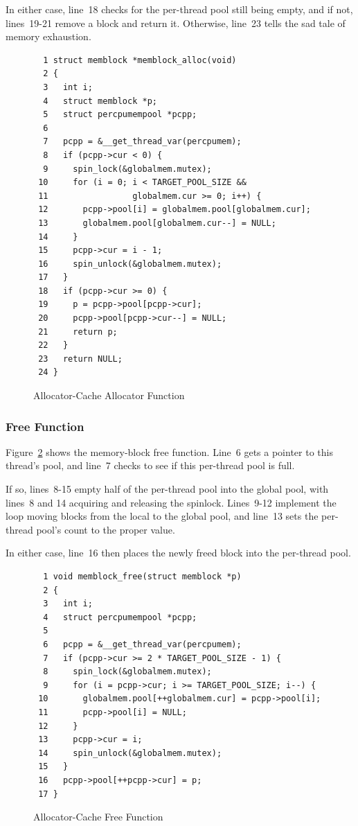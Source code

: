 In either case, line~18 checks for the per-thread pool still being
empty, and if not, lines~19-21 remove a block and return it.
Otherwise, line~23 tells the sad tale of memory exhaustion.

\begin{figure}[htbp]
{ \scriptsize
\begin{verbatim}
  1 struct memblock *memblock_alloc(void)
  2 {
  3   int i;
  4   struct memblock *p;
  5   struct percpumempool *pcpp;
  6
  7   pcpp = &__get_thread_var(percpumem);
  8   if (pcpp->cur < 0) {
  9     spin_lock(&globalmem.mutex);
 10     for (i = 0; i < TARGET_POOL_SIZE &&
 11                 globalmem.cur >= 0; i++) {
 12       pcpp->pool[i] = globalmem.pool[globalmem.cur];
 13       globalmem.pool[globalmem.cur--] = NULL;
 14     }
 15     pcpp->cur = i - 1;
 16     spin_unlock(&globalmem.mutex);
 17   }
 18   if (pcpp->cur >= 0) {
 19     p = pcpp->pool[pcpp->cur];
 20     pcpp->pool[pcpp->cur--] = NULL;
 21     return p;
 22   }
 23   return NULL;
 24 }
\end{verbatim}
}
\caption{Allocator-Cache Allocator Function}
\label{fig:SMPdesign:Allocator-Cache Allocator Function}
\end{figure}

\subsubsection{Free Function}

Figure~\ref{fig:SMPdesign:Allocator-Cache Free Function} shows
the memory-block free function.
Line~6 gets a pointer to this thread's pool, and
line~7 checks to see if this per-thread pool is full.

If so, lines~8-15 empty half of the per-thread pool into the global pool,
with lines~8 and 14 acquiring and releasing the spinlock.
Lines~9-12 implement the loop moving blocks from the local to the
global pool, and line~13 sets the per-thread pool's count to the proper
value.

In either case, line~16 then places the newly freed block into the
per-thread pool.

\begin{figure}[htbp]
{ \scriptsize
\begin{verbatim}
  1 void memblock_free(struct memblock *p)
  2 {
  3   int i;
  4   struct percpumempool *pcpp;
  5
  6   pcpp = &__get_thread_var(percpumem);
  7   if (pcpp->cur >= 2 * TARGET_POOL_SIZE - 1) {
  8     spin_lock(&globalmem.mutex);
  9     for (i = pcpp->cur; i >= TARGET_POOL_SIZE; i--) {
 10       globalmem.pool[++globalmem.cur] = pcpp->pool[i];
 11       pcpp->pool[i] = NULL;
 12     }
 13     pcpp->cur = i;
 14     spin_unlock(&globalmem.mutex);
 15   }
 16   pcpp->pool[++pcpp->cur] = p;
 17 }
\end{verbatim}
}
\caption{Allocator-Cache Free Function}
\label{fig:SMPdesign:Allocator-Cache Free Function}
\end{figure}

